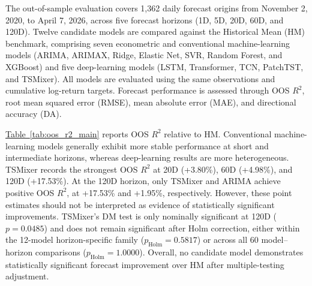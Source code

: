 \documentclass[12pt,twoside]{ord}
\begin{document}
The out-of-sample evaluation covers 1,362 daily forecast origins from November 2, 2020, to April 7, 2026, across five forecast horizons (1D, 5D, 20D, 60D, and 120D). Twelve candidate models are compared against the Historical Mean (HM) benchmark, comprising seven econometric and conventional machine-learning models (ARIMA, ARIMAX, Ridge, Elastic Net, SVR, Random Forest, and XGBoost) and five deep-learning models (LSTM, Transformer, TCN, PatchTST, and TSMixer). All models are evaluated using the same observations and cumulative log-return targets. Forecast performance is assessed through OOS $R^2$, root mean squared error (RMSE), mean absolute error (MAE), and directional accuracy (DA).

\hyperref[tab:oos_r2_main]{Table~\ref*{tab:oos_r2_main}} reports OOS $R^2$ relative to HM. Conventional machine-learning models generally exhibit more stable performance at short and intermediate horizons, whereas deep-learning results are more heterogeneous. TSMixer records the strongest OOS $R^2$ at 20D (+3.80\%), 60D (+4.98\%), and 120D (+17.53\%). At the 120D horizon, only TSMixer and ARIMA achieve positive OOS $R^2$, at +17.53\% and +1.95\%, respectively. However, these point estimates should not be interpreted as evidence of statistically significant improvements. TSMixer's DM test is only nominally significant at 120D ($p=0.0485$) and does not remain significant after Holm correction, either within the 12-model horizon-specific family ($p_{\mathrm{Holm}}=0.5817$) or across all 60 model--horizon comparisons ($p_{\mathrm{Holm}}=1.0000$). Overall, no candidate model demonstrates statistically significant forecast improvement over HM after multiple-testing adjustment.
\end{document}
